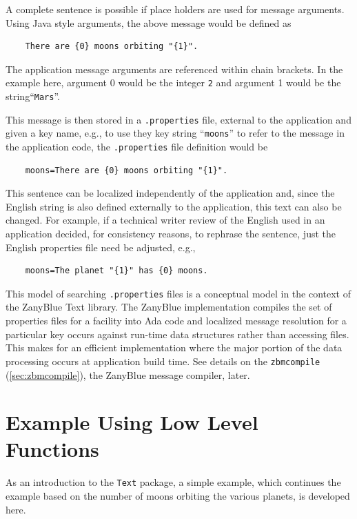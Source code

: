 A complete sentence is possible if place holders are used for message
arguments.  Using Java style arguments, the above message would be defined as
\begin{verbatim}
    There are {0} moons orbiting "{1}".
\end{verbatim}
The application message arguments are referenced within chain brackets.
In the example here, argument 0 would be the integer \texttt{2} and argument
1 would be the string``\texttt{Mars}''.

This message is then stored in a \texttt{.properties} file, external to the
application and given a key name, e.g., to use they key string
``\texttt{moons}'' to refer to the message in the application code, the
\texttt{.properties} file definition
would be
\begin{verbatim}
    moons=There are {0} moons orbiting "{1}".
\end{verbatim}

This sentence can be localized independently of the application and, since
the English string is also defined externally to the application, this
text can also be changed.  For example, if a technical writer review of the
English used in an application decided, for consistency reasons, to rephrase
the sentence, just the English properties file need be adjusted, e.g.,
\begin{verbatim}
    moons=The planet "{1}" has {0} moons.
\end{verbatim}

This model of searching \texttt{.properties} files is a conceptual model in the
context of the ZanyBlue Text library.  The ZanyBlue implementation compiles
the set of properties files for a facility into Ada code and localized message
resolution for a particular key occurs against run-time data structures rather
than accessing files.  This makes for an efficient implementation where the
major portion of the data processing occurs at application build time.  See
details on the \texttt{zbmcompile} (\ref{sec:zbmcompile}), the ZanyBlue message
compiler, later.

\section{Example Using Low Level Functions}

As an introduction to the \texttt{Text} package, a simple example, which
continues the example based on the number of moons orbiting the various
planets, is developed here.

